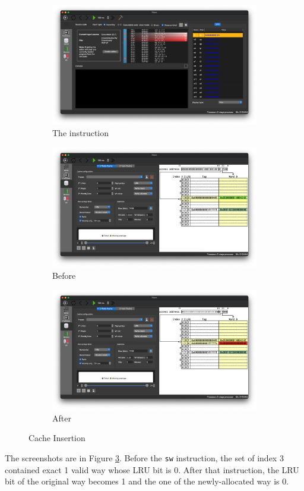 \documentclass[12pt, a4paper]{article}
\begin{document}
\begin{figure}[htbp]
\begin{subfigure}{\linewidth}
\centering
\includegraphics[width=.69\linewidth]{a}
\caption{The instruction}
\end{subfigure}
\begin{subfigure}{\linewidth}
\centering
\includegraphics[width=.807\linewidth]{a0}
\caption{Before}
\label{fig:1a0}
\end{subfigure}
\begin{subfigure}{\linewidth}
\centering
\includegraphics[width=.807\linewidth]{a1}
\caption{After}
\label{fig:1a1}
\end{subfigure}
\caption{Cache Insertion}
\label{fig:1a}
\end{figure}

The screenshots are in Figure \ref{fig:1a}. Before the \texttt{sw} instruction, the set of index 3 contained exact 1 valid way whose LRU bit is 0. After that instruction, the LRU bit of the original way becomes 1 and the one of the newly-allocated way is 0.
\end{document}
